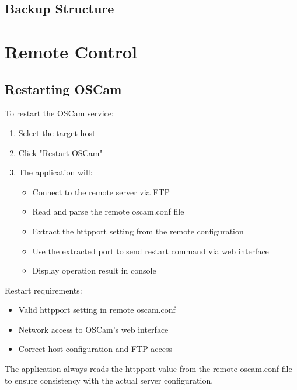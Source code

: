 \documentclass[a4paper,11pt]{report}
\begin{document}
\section{Backup Structure}

\chapter{Remote Control}

\section{Restarting OSCam}
\begin{procedurebox}
To restart the OSCam service:
\begin{enumerate}
    \item Select the target host
    \item Click "Restart OSCam"
    \item The application will:
    \begin{itemize}
        \item Connect to the remote server via FTP
        \item Read and parse the remote oscam.conf file
        \item Extract the httpport setting from the remote configuration
        \item Use the extracted port to send restart command via web interface
        \item Display operation result in console
    \end{itemize}
\end{enumerate}
\end{procedurebox}

\begin{warningbox}
Restart requirements:
\begin{itemize}
    \item Valid httpport setting in remote oscam.conf
    \item Network access to OSCam's web interface
    \item Correct host configuration and FTP access
\end{itemize}
\end{warningbox}

\begin{notebox}
The application always reads the httpport value from the remote oscam.conf file to ensure consistency with the actual server configuration.
\end{notebox}
\end{document}

